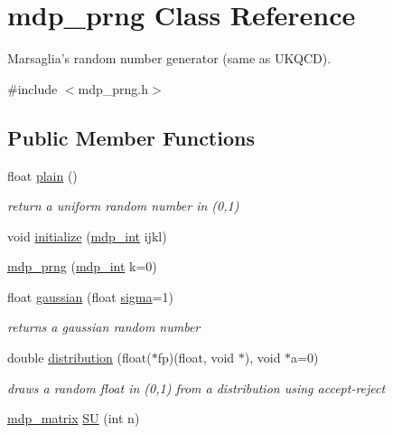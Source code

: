 \hypertarget{classmdp__prng}{
\section{mdp\_\-prng Class Reference}
\label{classmdp__prng}
}


Marsaglia's random number generator (same as UKQCD).  


{\ttfamily \#include $<$mdp\_\-prng.h$>$}\subsection*{Public Member Functions}
\begin{DoxyCompactItemize}
\item 
float \hyperlink{classmdp__prng_a261360660403dcd1a76305a8644b6a2d}{plain} ()
\begin{DoxyCompactList}\small\item\em return a uniform random number in (0,1) \item\end{DoxyCompactList}\item 
void \hyperlink{classmdp__prng_a2a41d455e32ec21fce0c76f71bda801a}{initialize} (\hyperlink{mdp__global__vars_8h_aaa1ad9d0dcd2124aa5af0120d9954174}{mdp\_\-int} ijkl)
\item 
\hyperlink{classmdp__prng_a57739df3a7629078ca66dbfd7ded1b86}{mdp\_\-prng} (\hyperlink{mdp__global__vars_8h_aaa1ad9d0dcd2124aa5af0120d9954174}{mdp\_\-int} k=0)
\item 
float \hyperlink{classmdp__prng_adf372628df14ef01302472264a7f26d8}{gaussian} (float \hyperlink{fermiqcd__gamma__matrices_8h_ab20455955848cb6945fe37dda0a2ef40}{sigma}=1)
\begin{DoxyCompactList}\small\item\em returns a gaussian random number \item\end{DoxyCompactList}\item 
double \hyperlink{classmdp__prng_a2ba8807aa153b9b222d6d724da06dfdd}{distribution} (float($\ast$fp)(float, void $\ast$), void $\ast$a=0)
\begin{DoxyCompactList}\small\item\em draws a random float in (0,1) from a distribution using accept-\/reject \item\end{DoxyCompactList}\item 
\hyperlink{classmdp__matrix}{mdp\_\-matrix} \hyperlink{classmdp__prng_a348d0a778f0c1e3dd71e163bad950936}{SU} (int n)

\end{DoxyCompactItemize}
